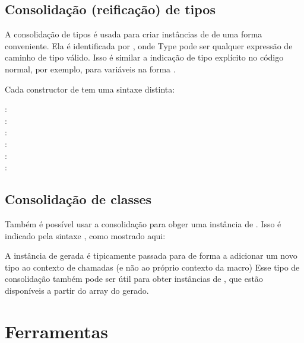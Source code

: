 \subsection{Consolidação (reificação) de tipos}
\label{macro-reification-type}

A consolidação de tipos é usada para criar instâncias de  de uma forma conveniente. Ela é identificada por , onde Type pode ser qualquer expressão de caminho de tipo válido. Isso é similar a indicação de tipo explícito no código normal, por exemplo, para variáveis na forma .

Cada constructor de  tem uma sintaxe distinta:

\begin{description}
	\item[:] 
	\item[:] 
	\item[:] 
	\item[:] 
	\item[:] 
	\item[:] 
\end{description}

\subsection{Consolidação de classes}
\label{macro-reification-class}

Também é possível usar a consolidação para obger uma instância de . Isso é indicado pela sintaxe , como mostrado aqui:


A instância de  gerada é tipicamente passada para  de forma a adicionar um novo tipo ao contexto de chamadas (e não ao próprio contexto da macro)
Esse tipo de consolidação também pode ser útil para obter instâncias de , que estão disponíveis a partir do array  do  gerado.

\section{Ferramentas}
\label{macro-tools}

